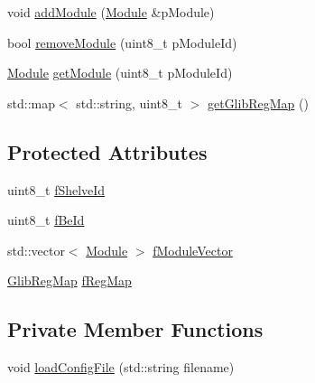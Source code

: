\begin{DoxyCompactItemize}
\item 
void \hyperlink{class_ph2___hw_description_1_1_glib_a1bbf1eb3a5d4efca9801d2eaca6f33f7}{add\-Module} (\hyperlink{class_ph2___hw_description_1_1_module}{Module} \&p\-Module)
\item 
bool \hyperlink{class_ph2___hw_description_1_1_glib_a64d98cba80674893dff1a91c69b0f34e}{remove\-Module} (uint8\-\_\-t p\-Module\-Id)
\item 
\hyperlink{class_ph2___hw_description_1_1_module}{Module} \hyperlink{class_ph2___hw_description_1_1_glib_ad5792871ed0cfed20c53bae432df3d93}{get\-Module} (uint8\-\_\-t p\-Module\-Id)
\item 
std\-::map$<$ std\-::string, uint8\-\_\-t $>$ \hyperlink{class_ph2___hw_description_1_1_glib_a971d4ea45771b8f93ca81bc794613262}{get\-Glib\-Reg\-Map} ()
\end{DoxyCompactItemize}
\subsection*{Protected Attributes}
\begin{DoxyCompactItemize}
\item 
uint8\-\_\-t \hyperlink{class_ph2___hw_description_1_1_glib_abcaa5b1cb716d3aa814688dd5691a421}{f\-Shelve\-Id}
\item 
uint8\-\_\-t \hyperlink{class_ph2___hw_description_1_1_glib_ac89e9a9eee11e41f901e90c619e50bfc}{f\-Be\-Id}
\item 
std\-::vector$<$ \hyperlink{class_ph2___hw_description_1_1_module}{Module} $>$ \hyperlink{class_ph2___hw_description_1_1_glib_a97b6535900b4fa8eef81c7e15a01cda4}{f\-Module\-Vector}
\item 
\hyperlink{namespace_ph2___hw_description_afc0e75a92548c3406e89bf39ca4c9bfb}{Glib\-Reg\-Map} \hyperlink{class_ph2___hw_description_1_1_glib_a1a0c6dba5a24c615e8609b03012a8970}{f\-Reg\-Map}
\end{DoxyCompactItemize}
\subsection*{Private Member Functions}
\begin{DoxyCompactItemize}
\item 
void \hyperlink{class_ph2___hw_description_1_1_glib_a2eb8576c349ced2ac44904179294bd42}{load\-Config\-File} (std\-::string filename)
\end{DoxyCompactItemize}


